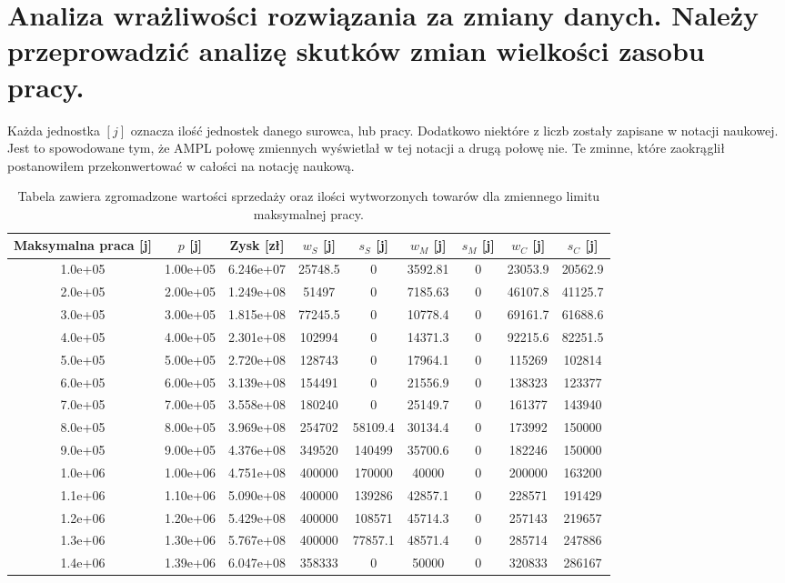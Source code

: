 \documentclass{article}
\begin{document}
\section{Analiza wrażliwości rozwiązania za zmiany danych. Należy przeprowadzić analizę skutków zmian wielkości zasobu pracy.}

Każda jednostka $[j]$ oznacza ilość jednostek danego surowca, lub pracy. Dodatkowo niektóre z liczb zostały zapisane w notacji naukowej. Jest to spowodowane tym, że AMPL połowę zmiennych wyświetlał w tej notacji a drugą połowę nie. Te zminne, które
zaokrąglił postanowiłem przekonwertować w całości na notację naukową.

\begin{table}[H]
  \begin{center}
    \begin{tabular}{|c| c| c| c| c| c| c| c| c| }
      \hline
      Maksymalna praca [j]& $p$ [j]& Zysk [zł] & $w_S$ [j]& $s_S$ [j]& $w_M$ [j]& $s_M$ [j]& $w_C$ [j]& $s_C$ [j] \\
      \hline
      1.0e+05  &1.00e+05  &6.246e+07  &25748.5  &0        &3592.81  &0  &23053.9  &20562.9 \\ \hline
      2.0e+05  &2.00e+05  &1.249e+08  &51497    &0        &7185.63  &0  &46107.8  &41125.7 \\ \hline
      3.0e+05  &3.00e+05  &1.815e+08  &77245.5  &0        &10778.4  &0  &69161.7  &61688.6 \\ \hline
      4.0e+05  &4.00e+05  &2.301e+08  &102994   &0        &14371.3  &0  &92215.6  &82251.5 \\ \hline
      5.0e+05  &5.00e+05  &2.720e+08  &128743   &0        &17964.1  &0  &115269   &102814 \\ \hline
      6.0e+05  &6.00e+05  &3.139e+08  &154491   &0        &21556.9  &0  &138323   &123377 \\ \hline
      7.0e+05  &7.00e+05  &3.558e+08  &180240   &0        &25149.7  &0  &161377   &143940 \\ \hline
      8.0e+05  &8.00e+05  &3.969e+08  &254702   &58109.4  &30134.4  &0  &173992   &150000 \\ \hline
      9.0e+05  &9.00e+05  &4.376e+08  &349520   &140499   &35700.6  &0  &182246   &150000 \\ \hline
      1.0e+06  &1.00e+06  &4.751e+08  &400000   &170000   &40000    &0  &200000   &163200 \\ \hline
      1.1e+06  &1.10e+06  &5.090e+08  &400000   &139286   &42857.1  &0  &228571   &191429 \\ \hline
      1.2e+06  &1.20e+06  &5.429e+08  &400000   &108571   &45714.3  &0  &257143   &219657 \\ \hline
      1.3e+06  &1.30e+06  &5.767e+08  &400000   &77857.1  &48571.4  &0  &285714   &247886 \\ \hline
      1.4e+06  &1.39e+06  &6.047e+08  &358333   &0        &50000    &0  &320833   &286167 \\ \hline
    \end{tabular} 
    \caption{\label{table:allData}Tabela zawiera zgromadzone wartości sprzedaży oraz ilości wytworzonych towarów dla zmiennego limitu maksymalnej pracy.}
  \end{center}
\end{table}
\end{document}

